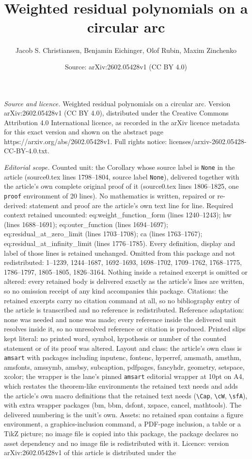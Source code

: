 \documentclass[10pt,a4paper]{amsart}
\title[Weighted residual polynomials on a circular arc]{Weighted residual polynomials on a circular arc}
\author{Jacob S. Christiansen, Benjamin Eichinger, Olof Rubin, Maxim Zinchenko}
\date{Source: arXiv:2602.05428v1 (CC BY 4.0)}
\begin{document}
\maketitle

\noindent\emph{Source and licence.} Weighted residual polynomials on a circular arc. Version arXiv:2602.05428v1 (CC BY 4.0), distributed under the Creative Commons Attribution 4.0 International licence, as recorded in the arXiv licence metadata for this exact version and shown on the abstract page https://arxiv.org/abs/2602.05428v1. Full rights notice: licenses/arxiv-2602.05428-CC-BY-4.0.txt.\par\smallskip

\noindent\textit{Editorial scope.} Counted unit: the Corollary whose source label is \texttt{None} in the article (source0.tex lines 1798--1804, source label \texttt{None}), delivered together with the article's own complete original proof of it (source0.tex lines 1806--1825, one \texttt{proof} environment of 20 lines). No mathematics is written, repaired or re-derived: statement and proof are the article's own text line for line. Required context retained uncounted: eq:weight\_function\_form (lines 1240--1243); hw (lines 1688--1691); eq:outer\_function (lines 1694--1697); eq:residual\_at\_zero\_limit (lines 1703--1708); ca (lines 1763--1767); eq:residual\_at\_infinity\_limit (lines 1776--1785). Every definition, display and label of those lines is retained unchanged. Omitted from this package and not redistributed: 1--1239, 1244--1687, 1692--1693, 1698--1702, 1709--1762, 1768--1775, 1786--1797, 1805--1805, 1826--3164. Nothing inside a retained excerpt is omitted or altered: every retained body is delivered exactly as the article's lines are written, so no omission receipt of any kind accompanies this package. Citations: the retained excerpts carry no citation command at all, so no bibliography entry of the article is transcribed and no reference is redistributed. Reference adaptation: none was needed and none was made; every reference inside the delivered unit resolves inside it, so no unresolved reference or citation is produced. Printed slips kept literal: no printed word, symbol, hypothesis or number of the counted statement or of its proof was altered. Layout and class: the article's own class is \texttt{amsart} with packages including inputenc, fontenc, hyperref, amsmath, amsthm, amsfonts, amssymb, amsbsy, subcaption, pdfpages, fancyhdr, geometry, setspace, xcolor; the wrapper is the lane's pinned \texttt{amsart} editorial wrapper at 10pt on A4, which restates the theorem-like environments the retained text needs and adds the article's own macro definitions that the retained text needs (\texttt{\textbackslash Cap}, \texttt{\textbackslash cW}, \texttt{\textbackslash sfA}), with extra wrapper packages (bm, bbm, dsfont, xspace, cancel, mathtools). The delivered numbering is the unit's own. Assets: no retained span contains a figure environment, a graphics-inclusion command, a PDF-page inclusion, a table or a TikZ picture; no image file is copied into this package, the package declares no asset dependency and no image file is redistributed with it. Licence: version arXiv:2602.05428v1 of this article is distributed under the 
\end{document}
